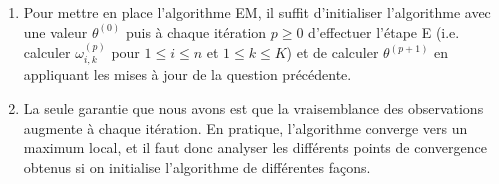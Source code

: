 \documentclass[a4paper,10pt,fleqn]{article}
\newcommand{\1}{\ensuremath{\mathbbm{1}}}
\begin{document}
\begin{enumerate}
\begin{enumerate}
$$$$
et on en d\'eduit que $k\mapsto\sum_{i=1}^n\omega_{i,k}^{(p)}(X_i)/\pi_k$ est constante. En utilisant par ailleurs que  $\sum_{k=1}^{K}\pi_k = 1$ et $\sum_{k=1}^{K}\omega_{i,k}^{(p)}(X_i)= 1$, on a
$$
\pi_k^{(p+1)} = \frac{1}{n}\sum_{i=1}^n\omega_{i,k}^{(p)}(X_i)\,.
$$
\item Pour mettre en place l'algorithme EM, il suffit d'initialiser l'algorithme avec une valeur $\theta^{(0)}$ puis \`a chaque it\'eration $p\geq 0$ d'effectuer l'\'etape E (i.e. calculer $\omega_{i,k}^{(p)}$ pour $1\leq i \leq n$ et $1\leq k \leq K$) et de calculer $\theta^{(p+1)}$ en appliquant les mises \`a jour de la question pr\'ec\'edente.
\item La seule garantie que nous avons est que la vraisemblance des observations augmente \`a chaque it\'eration. En pratique, l'algorithme converge vers un maximum local, et il faut donc analyser les diff\'erents points de convergence obtenus si on initialise l'algorithme de diff\'erentes fa\c cons. 
\end{enumerate}
\end{enumerate}
\end{document}
